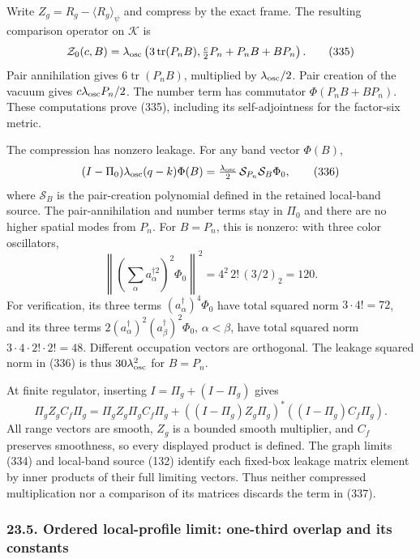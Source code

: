 \documentclass[
  11pt,
]{article}
\begin{document}
Write \(Z_g=R_g-\langle R_g\rangle_\psi\) and compress by the exact
frame. The resulting comparison operator on \(\mathcal K\) is \[
 {\cal Z}_0(c,B)=\lambda_{\rm osc}
 \left(3\operatorname{tr}(P_nB),
       \tfrac c2P_n+P_nB+BP_n\right).
 \tag{335}
\] Pair annihilation gives \(6\operatorname{tr}(P_nB)\), multiplied by
\(\lambda_{\rm osc}/2\). Pair creation of the vacuum gives
\(c\lambda_{\rm osc}P_n/2\). The number term has commutator
\(\Phi(P_nB+BP_n)\). These computations prove (335), including its
self-adjointness for the factor-six metric.

The compression has nonzero leakage. For any band vector \(\Phi(B)\), \[
 (I-\Pi_0)\lambda_{\rm osc}(q-k)\Phi(B)
 =\tfrac{\lambda_{\rm osc}}2\,{\cal S}_{P_n}{\cal S}_B\Phi_0,
 \tag{336}
\] where \(\mathcal S_B\) is the pair-creation polynomial defined in the
retained local-band source. The pair-annihilation and number terms stay
in \(\Pi_0\) and there are no higher spatial modes from \(P_n\). For
\(B=P_n\), this is nonzero: with three color oscillators, \[
 \left\|\left(\sum_\alpha a_\alpha^{\dagger2}\right)^2\Phi_0\right\|^2
 =4^2\,2!\,(3/2)_2=120.
\] For verification, its three terms \((a_\alpha^\dagger)^4\Phi_0\) have
total squared norm \(3\cdot4!=72\), and its three terms
\(2(a_\alpha^\dagger)^2(a_\beta^\dagger)^2\Phi_0\), \(\alpha<\beta\),
have total squared norm \(3\cdot4\cdot2!\cdot2!=48\). Different
occupation vectors are orthogonal. The leakage squared norm in (336) is
thus \(30\lambda_{\rm osc}^2\) for \(B=P_n\).

At finite regulator, inserting \(I=\Pi_g+(I-\Pi_g)\) gives \[
 \Pi_g Z_g C_f\Pi_g
 =\Pi_g Z_g\Pi_g C_f\Pi_g+
 ((I-\Pi_g)Z_g\Pi_g)^*((I-\Pi_g)C_f\Pi_g).
 \tag{337}
\] All range vectors are smooth, \(Z_g\) is a bounded smooth multiplier,
and \(C_f\) preserves smoothness, so every displayed product is defined.
The graph limits (334) and local-band source (132) identify each
fixed-box leakage matrix element by inner products of their full
limiting vectors. Thus neither compressed multiplication nor a
comparison of its matrices discards the term in (337).

\subsubsection{23.5. Ordered local-profile limit: one-third overlap and
its
constants}\label{ordered-local-profile-limit-one-third-overlap-and-its-constants}
\end{document}
